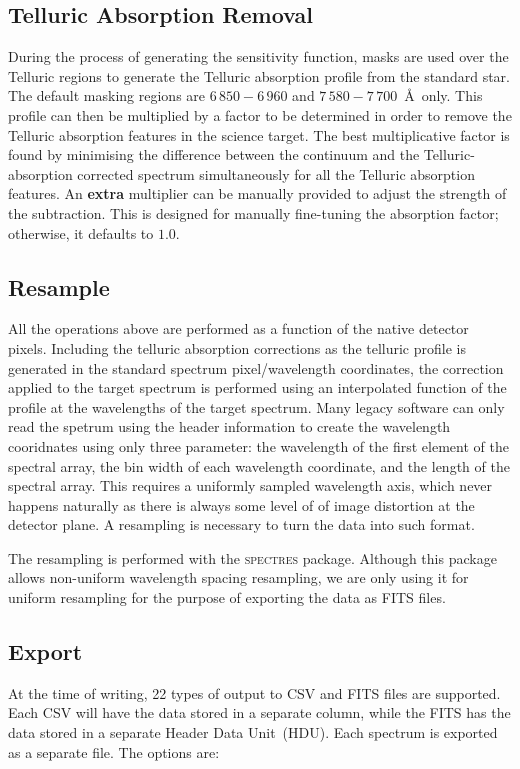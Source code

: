 \documentclass[linenumbers, twocolumn]{aastex631}
\begin{document}
\subsection{Telluric Absorption Removal}
During the process of generating the sensitivity function, masks are used
over the Telluric regions to generate the Telluric absorption
profile from the standard star. The default masking regions are $6\,850-6\,960$
and $7\,580-7\,700$\ \AA\ only. This profile can then be multiplied
by a factor to be determined in order to remove the Telluric absorption
features in the science target. The best multiplicative factor is found
by minimising the difference between the continuum and the Telluric-absorption
corrected spectrum simultaneously for all the Telluric absorption features.
An \textbf{extra} multiplier can be manually provided to adjust the
strength of the subtraction. This is designed for manually fine-tuning the
absorption factor; otherwise, it defaults to $1.0$.

\subsection{Resample}
All the operations above are performed as a function of the native detector
pixels. Including the telluric absorption corrections as the telluric profile
is generated in the standard spectrum pixel/wavelength coordinates, the
correction applied to the target spectrum is performed using an interpolated
function of the profile at the wavelengths of the target spectrum. Many legacy
software can only read the spetrum using the header information to create
the wavelength cooridnates using only three parameter: the wavelength of the
first element of the spectral array, the bin width of each wavelength
coordinate, and the length of the spectral array. This requires a uniformly
sampled wavelength axis, which never happens naturally as there is always some
level of of image distortion at the detector plane. A resampling is necessary
to turn the data into such format.

The resampling is performed with the \textsc{spectres} package. Although
this package allows non-uniform wavelength spacing resampling, we are only
using it for uniform resampling for the purpose of exporting the data as FITS
files.

\subsection{Export}
At the time of writing, 22 types of output to CSV and FITS files are supported.
Each CSV will have the data stored in a separate column, while the FITS has
the data stored in a separate Header Data Unit~(HDU). Each spectrum is exported
as a separate file. The options are:
\end{document}
